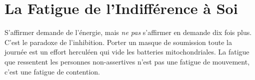 \section{La Fatigue de l'Indifférence à Soi}
S'affirmer demande de l'énergie, mais \textit{ne pas} s'affirmer en demande dix fois plus. C'est le paradoxe de l'inhibition. Porter un masque de soumission toute la journée est un effort herculéen qui vide les batteries mitochondriales. La fatigue que ressentent les personnes non-assertives n'est pas une fatigue de mouvement, c'est une fatigue de contention.
